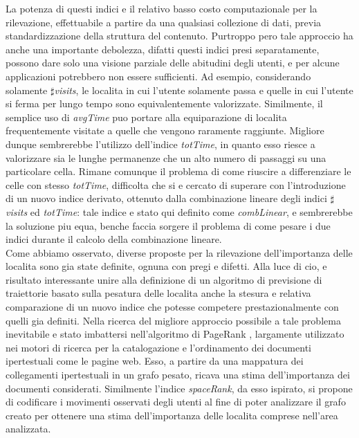 La potenza di questi indici e il relativo basso costo computazionale per la rilevazione,
effettuabile a partire da una qualsiasi collezione di dati, previa standardizzazione
della struttura del contenuto. Purtroppo pero tale approccio
ha anche una importante debolezza, difatti questi indici presi separatamente,
possono dare solo una visione parziale delle abitudini degli utenti, e per alcune
applicazioni potrebbero non essere sufficienti. Ad esempio, considerando solamente
$\sharp$\textit{visits}, le localita in cui l'utente solamente passa e quelle in cui l'utente
si ferma per lungo tempo sono equivalentemente valorizzate. Similmente, il
semplice uso di \textit{avgTime} puo portare alla equiparazione di localita frequentemente
visitate a quelle che vengono raramente raggiunte. Migliore dunque
sembrerebbe l'utilizzo dell'indice \textit{totTime}, in quanto esso riesce a valorizzare
sia le lunghe permanenze che un alto numero di passaggi su una particolare
cella. Rimane comunque il problema di come riuscire a differenziare le celle con
stesso \textit{totTime}, difficolta che si e cercato di superare con l'introduzione di un
nuovo indice derivato, ottenuto dalla combinazione lineare degli indici $\sharp$\textit{visits}
ed \textit{totTime}: tale indice e stato qui definito come \textit{combLinear}, e sembrerebbe
la soluzione piu equa, benche faccia sorgere il problema di come pesare i due
indici durante il calcolo della combinazione lineare.\\
Come abbiamo osservato, diverse proposte per la rilevazione dell'importanza
delle localita sono gia state definite, ognuna con pregi e difetti. Alla
luce di cio, e risultato interessante unire alla definizione di un algoritmo di
previsione di traiettorie basato sulla pesatura delle localita anche la stesura e
relativa comparazione di un nuovo indice che potesse competere prestazionalmente
con quelli gia definiti. Nella ricerca del migliore approccio possibile a
tale problema inevitabile e stato imbattersi nell'algoritmo di PageRank \cite{cit_45},
largamente utilizzato nei motori di ricerca per la catalogazione e l'ordinamento
dei documenti ipertestuali come le pagine web. Esso, a partire da una
mappatura dei collegamenti ipertestuali in un grafo pesato, ricava una stima
dell'importanza dei documenti considerati. Similmente l'indice \textit{spaceRank}, da
esso ispirato, si propone di codificare i movimenti osservati degli utenti al fine
di poter analizzare il grafo creato per ottenere una stima dell'importanza delle
localita comprese nell'area analizzata.

